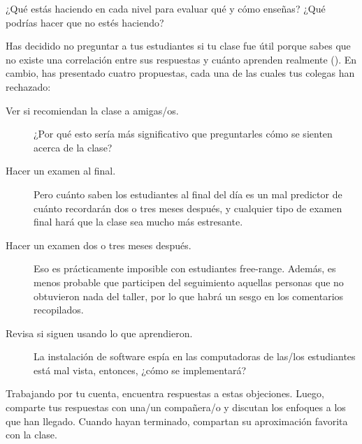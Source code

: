¿Qué estás haciendo en cada nivel para evaluar qué y cómo enseñas?
¿Qué podrías hacer que no estés haciendo?


Has decidido no preguntar a tus estudiantes si tu clase fue útil
porque sabes que no existe una correlación entre sus respuestas
y cuánto aprenden realmente ().
En cambio,
has presentado cuatro propuestas,
cada una de las cuales tus colegas han rechazado:

\begin{description}

\item[Ver si recomiendan la clase a amigas/os.]
  ¿Por qué esto sería más significativo
  que preguntarles cómo se sienten acerca de la clase?
 
\item[Hacer un examen al final.]
  Pero cuánto saben los estudiantes al final del día
  es un mal predictor de cuánto recordarán dos o tres meses después,
  y cualquier tipo de examen final hará que la clase sea mucho más estresante.
 
\item[Hacer un examen dos o tres meses después.]
  Eso es prácticamente imposible con estudiantes free-range. 
  Además, es menos probable que participen del seguimiento
  aquellas personas que no obtuvieron nada del taller, 
  por lo que habrá un sesgo en los comentarios recopilados.
 
\item[Revisa si siguen usando lo que aprendieron.]
  La instalación de software espía en las computadoras de las/los estudiantes está mal vista,
  entonces, ¿cómo se implementará?

\end{description}

Trabajando por tu cuenta,
encuentra respuestas a estas objeciones.
Luego, comparte tus respuestas con una/un compañera/o
y discutan los enfoques a los que han llegado.
Cuando hayan terminado,
compartan su aproximación favorita con la clase.
